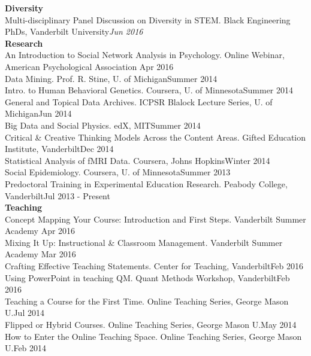 {\large \textbf{Diversity}}\\
Multi-disciplinary Panel Discussion on Diversity in STEM. Black Engineering PhDs, Vanderbilt University\hfill{\textit{Jun 2016}}
\smallskip\\
{\large \textbf{Research}}\\
An Introduction to Social Network Analysis in Psychology. Online Webinar, American Psychological Association \hfill{Apr 2016}\smallskip\\
Data Mining. Prof. R. Stine, U. of Michigan\hfill{Summer 2014}\smallskip\\
Intro. to Human Behavioral Genetics. Coursera, U. of Minnesota\hfill{Summer 2014}%
\smallskip\\
General and Topical Data Archives. ICPSR Blalock Lecture Series, U. of Michigan\hfill{Jun 2014}\smallskip\\
Big Data and Social Physics. edX, MIT\hfill{Summer 2014}%
\smallskip\\
Critical \& Creative Thinking Models Across the Content Areas. Gifted Education Institute, Vanderbilt\hfill{Dec 2014}\smallskip\\
Statistical Analysis of fMRI Data. Coursera, Johns Hopkins\hfill{Winter 2014}%
\smallskip\\
Social Epidemiology. Coursera, U. of Minnesota\hfill{Summer 2013}%
\smallskip\\
Predoctoral Training in Experimental Education Research. Peabody College, Vanderbilt\hfill{Jul 2013 - Present}\smallskip\\
%
%
{\large {\bf Teaching}}\\
Concept Mapping Your Course: Introduction and First Steps. Vanderbilt Summer Academy \hfill{Apr 2016}\smallskip\\
Mixing It Up: Instructional \& Classroom Management. Vanderbilt Summer Academy \hfill{Mar 2016}\smallskip\\
Crafting Effective Teaching Statements. Center for Teaching, Vanderbilt\hfill{Feb 2016}\smallskip\\
Using PowerPoint in teaching QM. Quant Methods Workshop, Vanderbilt\hfill{Feb 2016}\smallskip\\
Teaching a Course for the First Time. Online Teaching Series, George Mason U.\hfill{Jul 2014}\smallskip\\
Flipped or Hybrid Courses. Online Teaching Series, George Mason U.\hfill{May 2014}\smallskip\\
How to Enter the Online Teaching Space. Online Teaching Series, George Mason U.\hfill{Feb 2014}\smallskip\\
